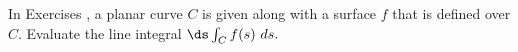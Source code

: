 {\noindent In Exercises}
{, a planar curve $C$ is given along with a surface $f$ that is defined over $C$. Evaluate the line integral $\ds \int_Cf(s)\ ds.$%
}
